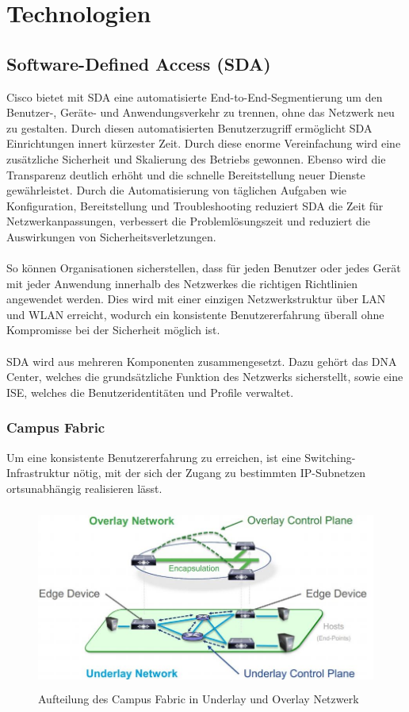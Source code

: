 \section{Technologien}

\subsection{Software-Defined Access (SDA)}
Cisco bietet mit SDA eine automatisierte End-to-End-Segmentierung um den Benutzer-, Geräte- und Anwendungsverkehr zu trennen, ohne das Netzwerk neu zu gestalten. Durch diesen automatisierten Benutzerzugriff ermöglicht SDA Einrichtungen innert kürzester Zeit. Durch diese enorme Vereinfachung wird eine zusätzliche Sicherheit und Skalierung des Betriebs gewonnen. Ebenso wird die Transparenz deutlich erhöht und die schnelle Bereitstellung neuer Dienste gewährleistet. Durch die Automatisierung von täglichen Aufgaben wie Konfiguration, Bereitstellung und Troubleshooting reduziert SDA die Zeit für Netzwerkanpassungen, verbessert die Problemlösungszeit und reduziert die Auswirkungen von Sicherheitsverletzungen.\\
\\
So können Organisationen sicherstellen, dass für jeden Benutzer oder jedes Gerät mit jeder Anwendung innerhalb des Netzwerkes die richtigen Richtlinien angewendet werden. Dies wird mit einer einzigen Netzwerkstruktur über LAN und WLAN erreicht, wodurch ein konsistente Benutzererfahrung überall ohne Kompromisse bei der Sicherheit möglich ist. \\
\\
SDA wird aus mehreren Komponenten zusammengesetzt. Dazu gehört das DNA Center, welches die grundsätzliche Funktion des Netzwerks sicherstellt, sowie eine ISE, welches die Benutzeridentitäten und Profile verwaltet. \cite{sda-definition}

\subsubsection{Campus Fabric} \label{CampusFabric}
Um eine konsistente Benutzererfahrung zu erreichen, ist eine Switching-Infrastruktur nötig, mit der sich der Zugang zu bestimmten IP-Subnetzen ortsunabhängig realisieren lässt. \cite{campusfabric-introduction} \\

\begin{figure}[H]
	\centering
	\includegraphics[height=6cm]{img/campusfabric.jpg}
	\caption{Aufteilung des Campus Fabric in Underlay und Overlay Netzwerk \cite{sda-1-0-whitepaper}}
	\label{fig:Campus Fabric}
\end{figure}

